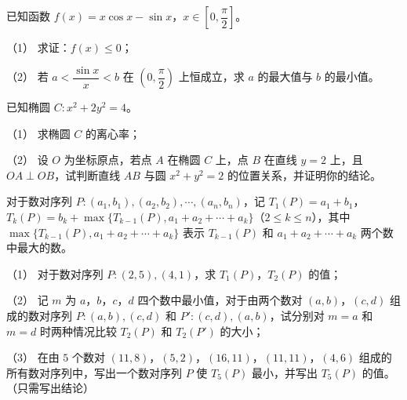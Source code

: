 \begin{question}
已知函数 $f(x)=x\cos x-\sin x$，$x\in\left[0,\dfrac\pi2\right]$。

（1） 求证：$f(x)\leqslant 0$；

（2） 若 $a<\dfrac{\sin x}x<b$ 在 $\left(0,\dfrac\pi2\right)$ 上恒成立，求 $a$ 的最大值与 $b$ 的最小值。

\end{question}
\begin{question}
已知椭圆 $C:x^2+2y^2=4$。

（1） 求椭圆 $C$ 的离心率；

（2） 设 $O$ 为坐标原点，若点 $A$ 在椭圆 $C$ 上，点 $B$ 在直线 $y=2$ 上，且 $OA\perp OB$，试判断直线 $AB$ 与圆 $x^2+y^2=2$ 的位置关系，并证明你的结论。

\end{question}
\begin{question}
对于数对序列 $P:(a_1,b_1),(a_2,b_2),\cdots,(a_n,b_n)$，记 $T_1(P)=a_1+b_1$，$T_k(P)=b_k+\max\{T_{k-1}(P),a_1+a_2+\cdots+a_k\}$（$2\leqslant k\leqslant n$），其中 $\max\{T_{k-1}(P),a_1+a_2+\cdots+a_k\}$ 表示 $T_{k-1}(P)$ 和 $a_1+a_2+\cdots+a_k$ 两个数中最大的数。

（1） 对于数对序列 $P:(2,5),(4,1)$，求 $T_1(P)$，$T_2(P)$ 的值；

（2） 记 $m$ 为 $a$，$b$，$c$，$d$ 四个数中最小值，对于由两个数对 $(a,b)$，$(c,d)$ 组成的数对序列 $P:(a,b),(c,d)$ 和 $P':(c,d),(a,b)$，试分别对 $m=a$ 和 $m=d$ 时两种情况比较 $T_2(P)$ 和 $T_2(P')$ 的大小；

（3） 在由 $5$ 个数对 $(11,8)$，$(5,2)$，$(16,11)$，$(11,11)$，$(4,6)$ 组成的所有数对序列中，写出一个数对序列 $P$ 使 $T_5(P)$ 最小，并写出 $T_5(P)$ 的值。（只需写出结论）

\end{question}